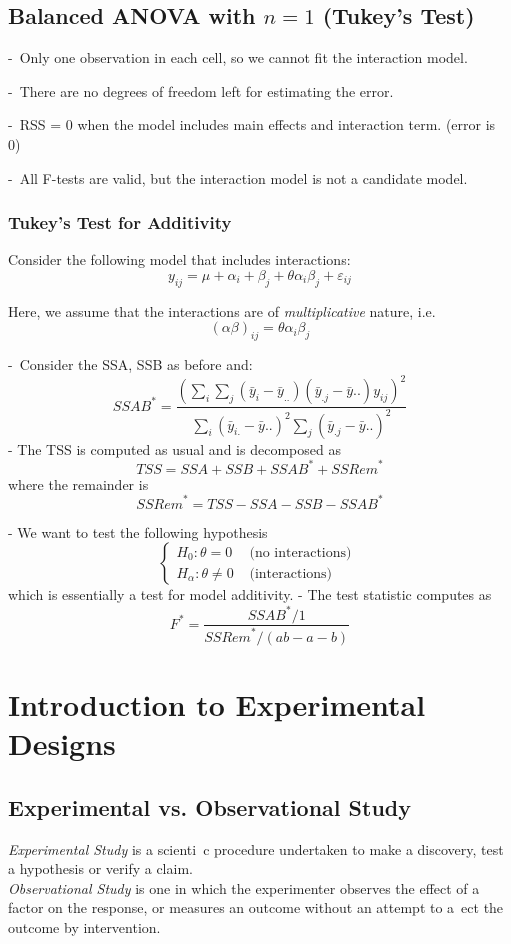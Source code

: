 \documentclass[11pt,a4paper]{article}
\begin{document}
\subsection{ Balanced ANOVA with $n = 1$ (Tukey’s Test)}
-\ Only one observation in each cell, so we cannot ﬁt the interaction model.

-\ There are no degrees of freedom left for estimating the error.

-\ RSS = 0 when the model includes main eﬀects and interaction term. (error is 0)

-\ All F-tests are valid, but the interaction model is not a candidate model.

\subsubsection{ Tukey’s Test for Additivity}
Consider the following model that includes interactions:
$$y_{ij}=\mu+\alpha_i+\beta_j+\theta\alpha_i\beta_j+\varepsilon_{ij}$$

Here, we assume that the interactions are of \textit{multiplicative} nature, i.e.
$$(\alpha\beta)_{ij}=\theta\alpha_i\beta_j$$

-\ Consider the SSA, SSB as before and:
$$
{S S A B}^{*}=\frac{\left(\sum_{i} \sum_{j}\left(\bar{y}_{i}-\bar{y}_{. .}\right)\left(\bar{y}_{. j}-\bar{y} . .\right) y_{i j}\right)^{2}}{\sum_{i}\left(\bar{y}_{i .}-\bar{y} . .\right)^{2} \sum_{j}\left(\bar{y}_{. j}-\bar{y} . .\right)^{2}}
$$
- The TSS is computed as usual and is decomposed as
$$
T S S=S S A+S S B+{S S A B}^{*}+{S S R e m}^{*}
$$
where the remainder is
$$
{S S R e m}^{*}=T S S-S S A-S S B-S S A B^{*}
$$

- We want to test the following hypothesis
$$
\begin{cases}H_{0}: \theta=0 & \text { (no interactions) } \\ H_{\alpha}: \theta \neq 0 & \text { (interactions) }\end{cases}
$$
which is essentially a test for model additivity.
- The test statistic computes as
$$
F^{*}=\frac{{S S A B}^{*} / 1}{{S S R e m}^{*} /(a b-a-b)}
$$


\section{Introduction to Experimental Designs}
\subsection{ Experimental vs. Observational Study}
\textit{Experimental Study} is a scienti c procedure undertaken to make a discovery, test a hypothesis or verify a claim.\\
\textit{Observational Study} is one in which the experimenter observes the effect of a factor on the response, or measures an outcome without an attempt to a ect the outcome by intervention.
\end{document}
